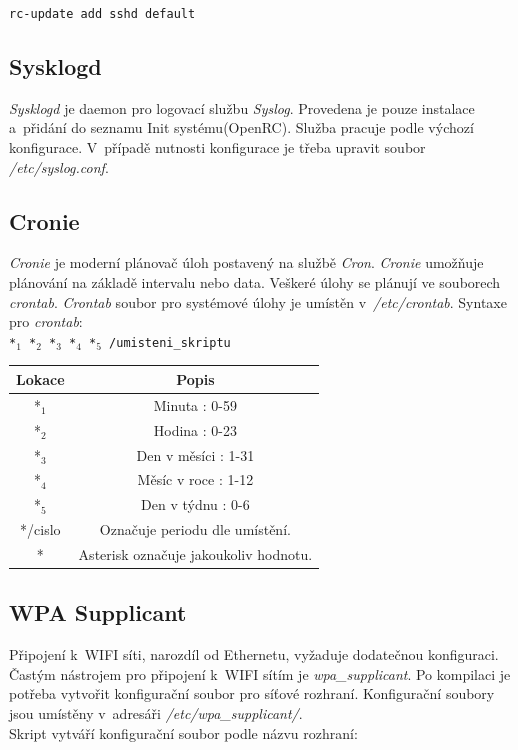 \documentclass[12pt,a4paper,twoside,]{article}
\begin{document}
{{{{{{\texttt{rc-update add sshd default}
\subsection{\textsf{Sysklogd}} 
\textit{Sysklogd} je daemon pro logovací službu \textit{Syslog}. Provedena je pouze instalace a~přidání do seznamu Init systému(OpenRC). Služba pracuje podle výchozí konfigurace. V~případě nutnosti konfigurace je třeba upravit soubor \textit{/etc/syslog.conf}.

\subsection{\textsf{Cronie}}

\textit{Cronie} je moderní plánovač úloh postavený na službě \textit{Cron}. \textit{Cronie} umožňuje plánování na základě intervalu nebo data. Veškeré úlohy se plánují ve souborech \textit{crontab}. \textit{Crontab} soubor pro systémové úlohy je umístěn v~\textit{/etc/crontab}. Syntaxe pro \textit{crontab}:\\

\texttt{*$_{1}$ *$_{2}$ *$_{3}$ *$_{4}$ *$_{5}$ /umisteni\_skriptu}

\begin{table}[h]
	\centering
	\begin{tabular}{|c|c|}
		\hline 
		Lokace&Popis \\
		\hline
		*$_{1}$&  Minuta : 0-59 \\
		\hline
		*$_{2}$&  Hodina : 0-23 \\
		\hline
		*$_{3}$&  Den v měsíci : 1-31 \\
		\hline
		*$_{4}$&  Měsíc v roce : 1-12 \\
		\hline
		*$_{5}$&  Den v týdnu : 0-6 \\
		\hline
		*/cislo&  Označuje periodu dle umístění. \\
		\hline
		*&  Asterisk označuje jakoukoliv hodnotu. \\
		\hline
	\end{tabular}

\end{table}
\subsection{\textsf{WPA Supplicant}}
Připojení k~WIFI síti, narozdíl od Ethernetu, vyžaduje dodatečnou konfiguraci. Častým nástrojem pro připojení k~WIFI sítím je \textit{wpa\_supplicant}. Po kompilaci je potřeba vytvořit konfigurační soubor pro síťové rozhraní. Konfigurační soubory jsou umístěny v~adresáři \textit{/etc/wpa\_supplicant/}.\\ Skript vytváří konfigurační soubor podle názvu rozhraní:\\

}}}}}}
\end{document}
